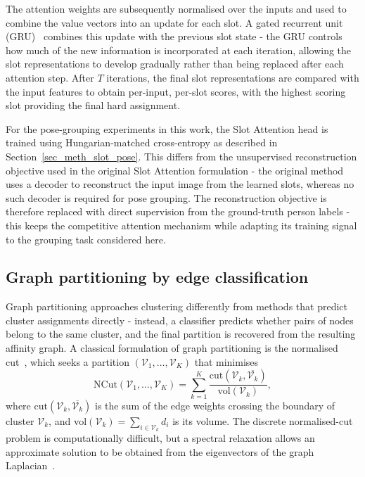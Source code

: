 The attention weights are subsequently normalised over the inputs
and used to combine the value vectors into an update for each slot.
A gated recurrent unit (GRU)~\cite{cho2014gru} combines this update with the previous slot state -
the GRU controls how much of the new information is incorporated at each iteration,
allowing the slot representations to develop gradually rather than being replaced after each attention step.
After $T$ iterations,
the final slot representations are compared with the input features to obtain per-input, per-slot scores,
with the highest scoring slot providing the final hard assignment.

For the pose-grouping experiments in this work,
the Slot Attention head is trained using Hungarian-matched cross-entropy
as described in Section~\ref{sec_meth_slot_pose}.
This differs from the unsupervised reconstruction objective used in the original Slot Attention formulation -
the original method uses a decoder to reconstruct the input image from the learned slots,
whereas no such decoder is required for pose grouping.
The reconstruction objective is therefore replaced with direct supervision from the ground-truth person labels -
this keeps the competitive attention mechanism
while adapting its training signal to the grouping task considered here.

\subsection{Graph partitioning by edge classification}
\label{sec_meth_partition_prelim}

Graph partitioning approaches clustering differently from methods that predict cluster assignments directly -
instead, a classifier predicts whether pairs of nodes belong to the same cluster,
and the final partition is recovered from the resulting affinity graph.
A classical formulation of graph partitioning is the normalised cut~\cite{shi2000ncut},
which seeks a partition $(\mathcal{V}_1, \dots, \mathcal{V}_K)$ that minimises
\begin{equation}
    \mathrm{NCut}(\mathcal{V}_1, \dots, \mathcal{V}_K)
    = \sum_{k=1}^{K}
    \frac{\mathrm{cut}(\mathcal{V}_k, \overline{\mathcal{V}_k})}
         {\mathrm{vol}(\mathcal{V}_k)},
    \label{eq:ncut}
\end{equation}
where $\mathrm{cut}(\mathcal{V}_k, \overline{\mathcal{V}_k})$ is the sum of the edge weights
crossing the boundary of cluster $\mathcal{V}_k$,
and $\mathrm{vol}(\mathcal{V}_k) = \sum_{i \in \mathcal{V}_k} d_i$ is its volume.
The discrete normalised-cut problem is computationally difficult,
but a spectral relaxation allows an approximate solution to be obtained
from the eigenvectors of the graph Laplacian~\cite{vonluxburg2007spectral}.

